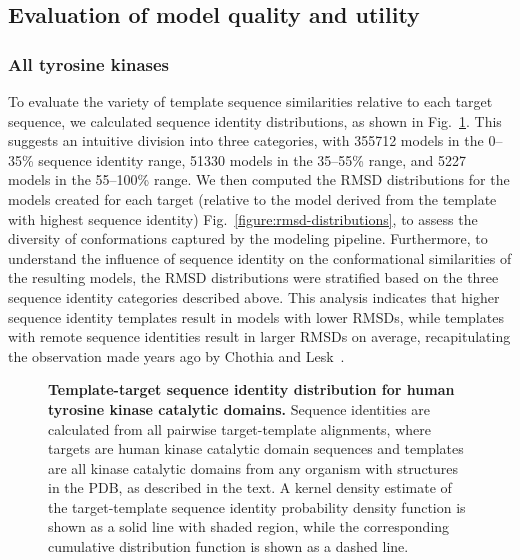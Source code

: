 \documentclass[aps,prl,preprint,nofootinbib,superscriptaddress,linenumbers]{revtex4-1}
\begin{document}
\subsection*{Evaluation of model quality and utility}

\subsubsection*{All tyrosine kinases}


To evaluate the variety of template sequence similarities relative to each target sequence, we calculated sequence identity distributions, as shown in Fig.~\ref{figure:sequence-identity-distribution}.
This suggests an intuitive division into three categories, with \num{355712} models in the 0--35\% sequence identity range, \num{51330} models in the 35--55\% range, and \num{5227} models in the 55--100\% range.
We then computed the RMSD distributions for the models created for each target (relative to the model derived from the template with highest sequence identity) Fig.~\ref{figure:rmsd-distributions}, to assess the diversity of conformations captured by the modeling pipeline.
Furthermore, to understand the influence of sequence identity on the conformational similarities of the resulting models, the RMSD distributions were stratified based on the three sequence identity categories described above.
This analysis indicates that higher sequence identity templates result in models with lower RMSDs, while templates with remote sequence identities result in larger RMSDs on average, recapitulating the observation made years ago by Chothia and Lesk~\cite{chothia-lesk:embo-j:1986:rmsd-sequence-identity-relation}.


\begin{figure}[tb]

    \caption{{\bf Template-target sequence identity distribution for human tyrosine kinase catalytic domains.}
    Sequence identities are calculated from all pairwise target-template alignments, where targets are human kinase catalytic domain sequences and templates are all kinase catalytic domains from any organism with structures in the PDB, as described in the text.
    A kernel density estimate of the target-template sequence identity probability density function is shown as a solid line with shaded region, while the corresponding cumulative distribution function is shown as a dashed line.
  \label{figure:sequence-identity-distribution}
    }
\end{figure}
\end{document}
